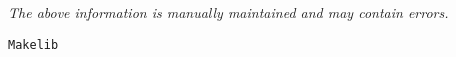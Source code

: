 \label{pkg:makelib}

{\tiny \it The above information is manually maintained and may contain errors.}
\begin{verbatim}
Makelib
\end{verbatim}
